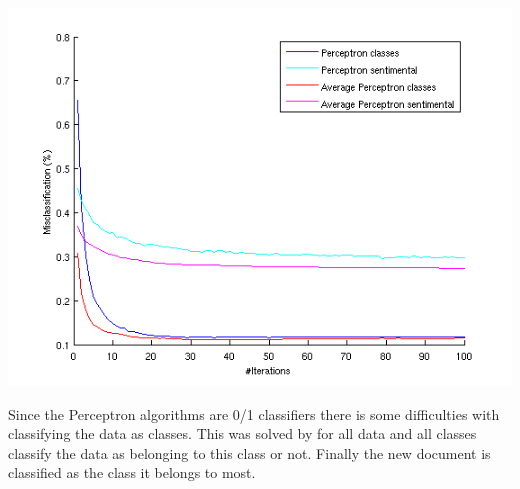 \begin{center}
\includegraphics[scale = 0.8]{fig/perceptron_2000words_unigram_10foldcv_classes-high_sentimental-low.png}
\end{center}
Since the Perceptron algorithms are 0/1 classifiers there is some difficulties with classifying the data as classes. This was solved by for all data and all classes classify the data as belonging to this class or not. Finally the new document is classified as the class it belongs to most.


